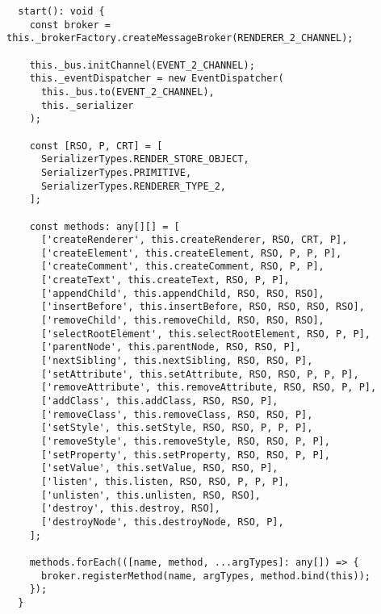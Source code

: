 \begin{verbatim}
  start(): void {
    const broker = this._brokerFactory.createMessageBroker(RENDERER_2_CHANNEL);

    this._bus.initChannel(EVENT_2_CHANNEL);
    this._eventDispatcher = new EventDispatcher(
      this._bus.to(EVENT_2_CHANNEL),
      this._serializer
    );

    const [RSO, P, CRT] = [
      SerializerTypes.RENDER_STORE_OBJECT,
      SerializerTypes.PRIMITIVE,
      SerializerTypes.RENDERER_TYPE_2,
    ];

    const methods: any[][] = [
      ['createRenderer', this.createRenderer, RSO, CRT, P],
      ['createElement', this.createElement, RSO, P, P, P],
      ['createComment', this.createComment, RSO, P, P],
      ['createText', this.createText, RSO, P, P],
      ['appendChild', this.appendChild, RSO, RSO, RSO],
      ['insertBefore', this.insertBefore, RSO, RSO, RSO, RSO],
      ['removeChild', this.removeChild, RSO, RSO, RSO],
      ['selectRootElement', this.selectRootElement, RSO, P, P],
      ['parentNode', this.parentNode, RSO, RSO, P],
      ['nextSibling', this.nextSibling, RSO, RSO, P],
      ['setAttribute', this.setAttribute, RSO, RSO, P, P, P],
      ['removeAttribute', this.removeAttribute, RSO, RSO, P, P],
      ['addClass', this.addClass, RSO, RSO, P],
      ['removeClass', this.removeClass, RSO, RSO, P],
      ['setStyle', this.setStyle, RSO, RSO, P, P, P],
      ['removeStyle', this.removeStyle, RSO, RSO, P, P],
      ['setProperty', this.setProperty, RSO, RSO, P, P],
      ['setValue', this.setValue, RSO, RSO, P],
      ['listen', this.listen, RSO, RSO, P, P, P],
      ['unlisten', this.unlisten, RSO, RSO],
      ['destroy', this.destroy, RSO],
      ['destroyNode', this.destroyNode, RSO, P],
    ];

    methods.forEach(([name, method, ...argTypes]: any[]) => {
      broker.registerMethod(name, argTypes, method.bind(this));
    });
  }
\end{verbatim}
